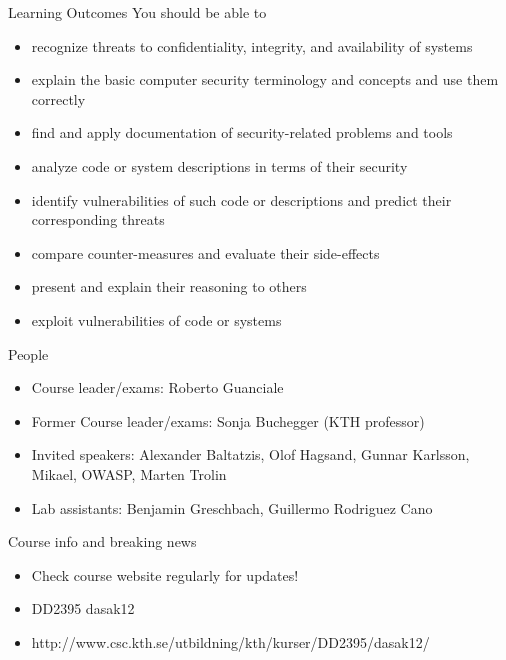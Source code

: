 \documentclass{beamer}
\begin{document}
\begin{frame}{Learning Outcomes}
  You should be able to
  \begin{itemize}
    \item recognize threats to confidentiality, integrity, and
      availability of systems
    \item explain the basic computer security terminology and concepts
      and use them correctly 
    \item find and apply documentation of security-related problems
      and tools 
    \item analyze code or system descriptions in terms
      of their security
    \item identify vulnerabilities of such code or descriptions and
      predict their corresponding threats
    \item compare counter-measures and evaluate their side-effects
    \item present and explain their reasoning to others
    \item exploit vulnerabilities of code or systems
  \end{itemize}
\end{frame}

\begin{frame}{People}
  \begin{itemize}
    \item Course leader/exams: Roberto Guanciale
    \item Former Course leader/exams: Sonja Buchegger (KTH professor)
    \item Invited speakers:
      Alexander Baltatzis,
      Olof Hagsand,
      Gunnar Karlsson,
      Mikael,
      OWASP,
      Marten Trolin 
    \item Lab assistants: 
      Benjamin Greschbach,
      Guillermo Rodriguez Cano
  \end{itemize}
\end{frame}

\begin{frame}{Course info and breaking news}
  \begin{itemize}
    \item Check course website regularly for updates!
    \item DD2395 dasak12
    \item http://www.csc.kth.se/utbildning/kth/kurser/DD2395/dasak12/
  \end{itemize}
\end{frame}
\end{document}
